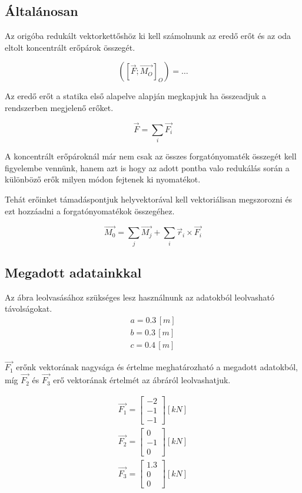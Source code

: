 \subsection{Általánosan}

Az origóba redukált vektorkettőshöz ki kell számolnunk az eredő erőt és az oda eltolt koncentrált erőpárok összegét.

$$([\vec{F}; \vec{M_O}]_O) = \ldots$$

Az eredő erőt a statika első alapelve alapján megkapjuk ha összeadjuk a rendszerben megjelenő erőket.

$$\vec{F} = \sum_{i} \vec{F_i}$$

A koncentrált erőpároknál már nem csak az összes forgatónyomaték összegét kell figyelembe vennünk, hanem azt is hogy az adott pontba valo redukálás során a különböző erők milyen módon fejtenek ki nyomatékot.

Tehát erőinket támadáspontjuk helyvektorával kell vektoriálisan megszorozni és ezt hozzáadni a forgatónyomatékok összegéhez.

$$\vec{M_0} = \sum_{j} \vec{M_j} + \sum_{i} \vec{r}_i \times \vec{F_i}$$

\subsection{Megadott adatainkkal}

Az ábra leolvasásához szükséges lesz használnunk az adatokból leolvasható távolságokat.
\begin{align}
	a = 0.3 \, [\si{m}] \\ 
	b = 0.3 \, [\si{m}] \\
	c = 0.4 \, [\si{m}]
\end{align}

$\vec{F_1}$ erőnk vektorának nagysága és értelme meghatározható a megadott adatokból, míg $\vec{F_2}$ és $\vec{F_3}$ erő vektorának értelmét az ábráról leolvashatjuk.

\begin{align}
	\vec{F_1} = \begin{bmatrix} -2 \\ -1 \\ -1 \end{bmatrix} [\si{kN}] \\
	\vec{F_2} = \begin{bmatrix} 0 \\ -1 \\ 0 \end{bmatrix} [\si{kN}] \\
	\vec{F_3} = \begin{bmatrix} 1.3 \\ 0 \\ 0 \end{bmatrix} [\si{kN}]
\end{align}

